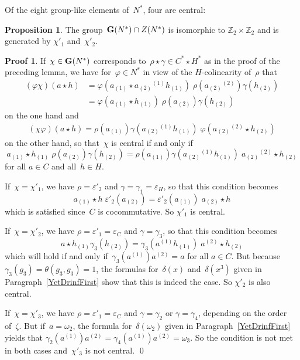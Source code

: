 \documentclass{article}
\numberwithin{equation}{section}
\theoremstyle{definition}
\newtheorem*{prop}{Proposition}
\newtheorem*{pf}{Proof}
\theoremstyle{break}
\newcommand{\1}{{(1)}}
\newcommand{\2}{{(2)}}
\newcommand{\3}{{(3)}}
\newcommand{\eh}{{\varepsilon_{H}}}
\newcommand{\Z}{{\mathbb Z}}
\begin{document}
Of the eight group-like elements of~$N^*$, four are central:
\begin{prop}
The group~${\bf G}(N^*) \cap Z(N^*)$ is isomorphic to $\Z_2 \times \Z_2$ and is generated by
$\chi'_1$ and~$\chi'_2$.
\end{prop}
\begin{pf}
If~$\chi \in {\bf G}(N^*)$ corresponds to~$\rho \star \gamma \in C^* \star H^*$ as in the proof of the preceding lemma, we have for~$\varphi \in N^*$ in view of the $H$-colinearity of~$\rho$ that
\begin{align*}
(\varphi \chi) (a \star h) &=
\varphi (a_\1 \star a_\2{}^\1 h_\1) \; \rho(a_\2{}^\2) \gamma(h_\2) \\
&= \varphi (a_\1 \star h_\1) \; \rho(a_\2) \gamma(h_\2)
\end{align*}
on the one hand and
\begin{align*}
(\chi \varphi) (a \star  h) =
\rho(a_\1) \gamma(a_\2{}^\1 h_\1) \; \varphi(a_\2{}^\2 \star h_\2)
\end{align*}
on the other hand, so that~$\chi$ is central if and only if
\[a_\1 \star h_\1 \; \rho(a_\2) \gamma(h_\2) =
\rho(a_\1) \gamma(a_\2{}^\1 h_\1) \; a_\2{}^\2 \star h_\2 \]
for all $a \in C$ and all~$h \in H$.

If~$\chi = \chi'_1$, we have $\rho = \varepsilon'_2$ and $\gamma = \gamma_1 = \eh$, so that this condition becomes
\[a_\1 \star h \; \varepsilon'_2(a_\2) = \varepsilon'_2(a_\1)  \; a_\2 \star h \]
which is satisfied since~$C$ is cocommutative. So $\chi'_1$ is central.

If~$\chi = \chi'_2$, we have $\rho = \varepsilon'_1 = \varepsilon_C$ and $\gamma = \gamma_3$,  so that this condition becomes
\[a \star h_\1 \gamma_3(h_\2) =  \gamma_3(a^\1 h_\1) \; a^\2 \star h_\2 \]
which will hold if and only if~$\gamma_3(a^\1) a^\2 = a$ for all $a \in C$. But because
$\gamma_3(g_3) = \theta(g_3, g_3) = 1$, the formulas for~$\delta(x)$ and~$\delta(x^3)$ given in Paragraph~\ref{YetDrinfFirst} show that this is indeed the case. So $\chi'_2$ is also central.

If~$\chi = \chi'_3$, we have $\rho = \varepsilon'_1 = \varepsilon_C$ and $\gamma = \gamma_2$ or $\gamma = \gamma_4$, depending on the order of~$\zeta$. But if~$a = \omega_2$, the formula for~$\delta(\omega_2)$ given in Paragraph~\ref{YetDrinfFirst} yields that $\gamma_2(a^\1) a^\2 = \gamma_4(a^\1) a^\2 =  \omega_3$. So the condition is not met in both cases and~$\chi'_3$ is not central.
\qed
\end{pf}
\end{document}
